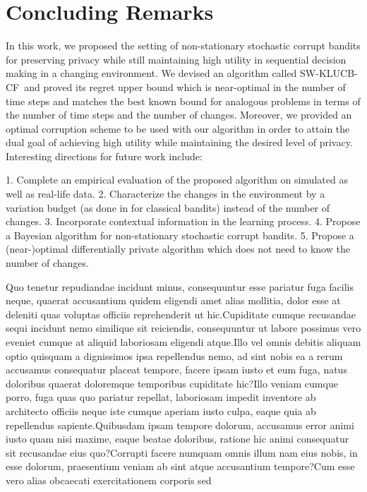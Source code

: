 \documentclass[letterpaper]{article} %
\newcommand{\SWKLUCBCF}{\textsc{SW-KLUCB-CF}}
\begin{document}
\section{Concluding Remarks}
In this work, we proposed the setting of non-stationary stochastic corrupt bandits for preserving privacy while still maintaining high utility in sequential decision making in a changing environment. We devised an algorithm called \SWKLUCBCF \ and proved its regret upper bound which is near-optimal in the number of time steps and matches the best known bound for analogous problems in terms of the number of time steps and the number of changes. Moreover, we provided an optimal corruption scheme to be used with our algorithm in order to attain the dual goal of achieving high utility while maintaining the desired level of privacy.  Interesting directions for future work include:
\begin{enumerate}
1. Complete an empirical evaluation of the proposed algorithm on simulated as well as real-life data.
2. Characterize the changes in the environment by a variation budget (as done in \citet{NIPS2014_903ce922} for classical bandits) instead of the number of changes.
3. Incorporate contextual information in the learning process. %
4. Propose a Bayesian algorithm for non-stationary stochastic corrupt bandits.
5. Propose a (near-)optimal differentially private algorithm which does not need to know the number of changes.
\end{enumerate}

Quo tenetur repudiandae incidunt minus, consequuntur esse pariatur fuga facilis neque, quaerat accusantium quidem eligendi amet alias mollitia, dolor esse at deleniti quas voluptas officiis reprehenderit ut hic.Cupiditate cumque recusandae sequi incidunt nemo similique sit reiciendis, consequuntur ut labore possimus vero eveniet cumque at aliquid laboriosam eligendi atque.Illo vel omnis debitis aliquam optio quisquam a dignissimos ipsa repellendus nemo, ad sint nobis ea a rerum accusamus consequatur placeat tempore, facere ipsam iusto et eum fuga, natus doloribus quaerat doloremque temporibus cupiditate hic?Illo veniam cumque porro, fuga quas quo pariatur repellat, laboriosam impedit inventore ab architecto officiis neque iste cumque aperiam iusto culpa, eaque quia ab repellendus sapiente.Quibusdam ipsam tempore dolorum, accusamus error animi iusto quam nisi maxime, eaque beatae doloribus, ratione hic animi consequatur sit recusandae eius quo?Corrupti facere numquam omnis illum nam eius nobis, in esse dolorum, praesentium veniam ab sint atque accusantium tempore?Cum esse vero alias obcaecati exercitationem corporis sed


\onecolumn
\end{document}
